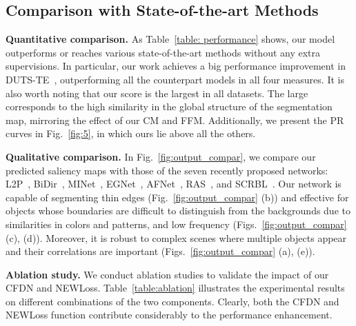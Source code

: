\documentclass{article}
\begin{document}
\subsection{Comparison with State-of-the-art Methods}
\label{sec:comparison}
\vspace{-0.1cm}
{\noindent \bf Quantitative comparison.}
As Table~\ref{table: performance} shows, our model outperforms or reaches various state-of-the-art methods without any extra supervisions. In particular, our work achieves a big performance improvement in DUTS-TE~\cite{wang2017learning}, outperforming all the counterpart models in all four measures. It is also worth noting that our  score is the largest in all datasets. The large  corresponds to the high similarity in the global structure of the segmentation map, mirroring the effect of our CM and FFM. Additionally, we present the PR curves in Fig.~\ref{fig:5}, in which ours lie above all the others.

{\noindent \bf Qualitative comparison.}
In Fig.~\ref{fig:output_compar}, we compare our predicted saliency maps with those of the seven recently proposed networks: L2P~\cite{zeng2018learning}, BiDir~\cite{zhang2018bi}, MINet~\cite{pang2020multi}, EGNet~\cite{zhao2019egnet}, AFNet~\cite{feng2019attentive}, RAS~\cite{chen2018reverse}, and SCRBL~\cite{zhang2020weakly}. Our network is capable of segmenting thin edges (Fig.~\ref{fig:output_compar} (b)) and effective for objects whose boundaries are difficult to distinguish from the backgrounds due to similarities in colors and patterns, and low frequency (Figs.~\ref{fig:output_compar} (c), (d)). Moreover, it is robust to complex scenes where multiple objects appear and their correlations are important (Figs.~\ref{fig:output_compar} (a), (e)). 


{\noindent \bf Ablation study.} 
We conduct ablation studies to validate the impact of our CFDN and NEWLoss. Table~\ref{table:ablation} illustrates the experimental results on different combinations of the two components. Clearly, both the CFDN and NEWLoss function contribute considerably to the performance enhancement. 
\end{document}
